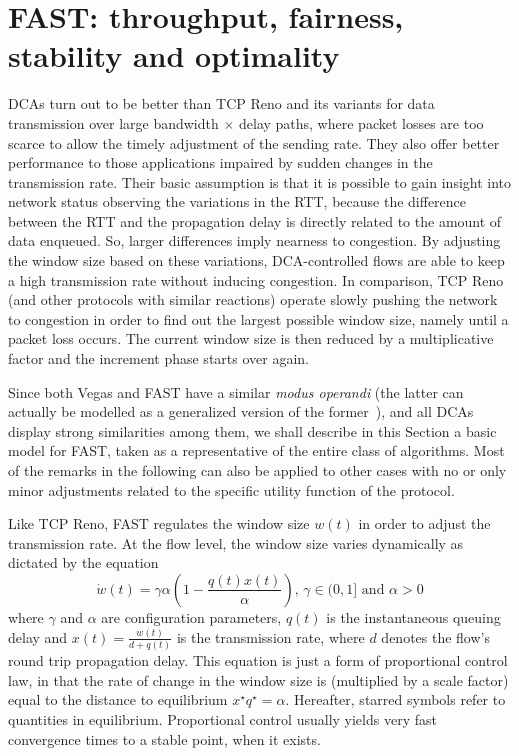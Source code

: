 \documentclass[english,times]{ettauth}
\begin{document}
\section{FAST: throughput, fairness, stability and optimality}
\label{sec:background}

DCAs turn out to be better than TCP Reno and its variants for data
transmission over large bandwidth$\,\times\,$delay paths, where packet losses
are too scarce to allow the timely adjustment of the sending rate. They also
offer better performance to those applications impaired by sudden changes in
the transmission rate. Their basic assumption is that it is possible to gain
insight into network status observing the variations in the RTT, because the
difference between the RTT and the propagation delay is directly related to
the amount of data enqueued. So, larger differences imply nearness to
congestion. By adjusting the window size based on these variations,
DCA-controlled flows are able to keep a high transmission rate without
inducing congestion. In comparison, TCP Reno (and other protocols with similar
reactions) operate slowly pushing the network to congestion in order to find
out the largest possible window size, namely until a packet loss occurs. The
current window size is then reduced by a multiplicative factor and the
increment phase starts over again.

Since both Vegas and FAST have a similar \emph{modus operandi} (the latter
can actually be modelled as a generalized version of the former~\cite{Wei06}),
and all DCAs display strong similarities among them, we shall describe in this
Section a basic model for FAST, taken as a representative of the entire class
of algorithms. Most of the remarks in the following can also be applied to
other cases with no or only minor adjustments related to the specific utility
function of the protocol.

Like TCP Reno, FAST regulates the window size $w(t)$ in order to adjust the
transmission rate.  At the flow level, the window size varies dynamically as
dictated by the equation
\begin{equation}
  \label{eq:dynamic_fast}
  \dot w(t) = \gamma \alpha \left(
    1 - \frac{q(t) x(t)}{\alpha}
    \right),\,\gamma \in (0,1] \text{ and } \alpha > 0
\end{equation}
where $\gamma$ and $\alpha$ are configuration parameters, $q(t)$ is the
instantaneous queuing delay and $x(t) = \frac{w(t)}{d + q(t)}$ is the
transmission rate, where $d$ denotes the flow's round trip propagation delay.
This equation is just a form of proportional control law, in that the rate of
change in the window size is (multiplied by a scale factor) equal to the
distance to equilibrium $x^\star q^\star = \alpha$. Hereafter, starred symbols
refer to quantities in equilibrium. Proportional control usually yields very
fast convergence times to a stable point, when it exists.
\end{document}
